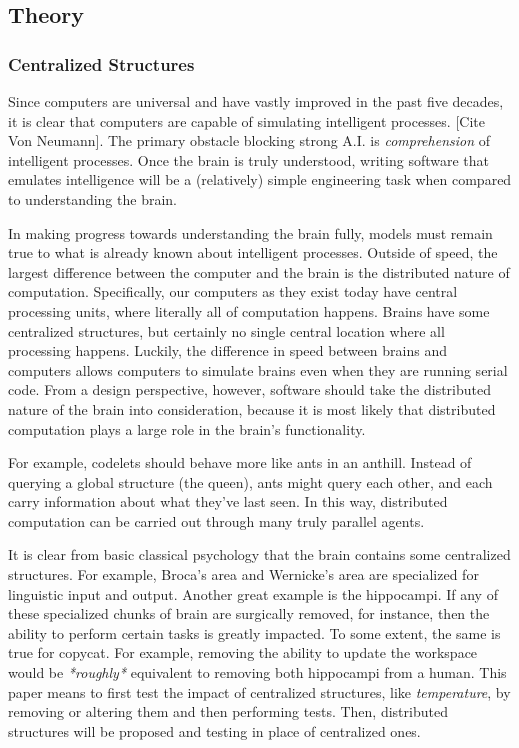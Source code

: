 \documentclass[a4paper]{article}
\begin{document}
\subsection{Theory}

    \subsubsection{Centralized Structures}

    Since computers are universal and have vastly improved in the past five decades, it is clear that computers are capable of simulating intelligent processes. 
    [Cite Von Neumann]. 
    The primary obstacle blocking strong A.I. is \emph{comprehension} of intelligent processes. 
    Once the brain is truly understood, writing software that emulates intelligence will be a (relatively) simple engineering task when compared to understanding the brain. 

    In making progress towards understanding the brain fully, models must remain true to what is already known about intelligent processes.
    Outside of speed, the largest difference between the computer and the brain is the distributed nature of computation. 
    Specifically, our computers as they exist today have central processing units, where literally all of computation happens. 
    Brains have some centralized structures, but certainly no single central location where all processing happens. 
    Luckily, the difference in speed between brains and computers allows computers to simulate brains even when they are running serial code.
    From a design perspective, however, software should take the distributed nature of the brain into consideration, because it is most likely that distributed computation plays a large role in the brain's functionality.

    For example, codelets should behave more like ants in an anthill.
    Instead of querying a global structure (the queen), ants might query each other, and each carry information about what they've last seen.
    In this way, distributed computation can be carried out through many truly parallel agents.

    It is clear from basic classical psychology that the brain contains some centralized structures.
    For example, Broca's area and Wernicke's area are specialized for linguistic input and output.
    Another great example is the hippocampi.
    If any of these specialized chunks of brain are surgically removed, for instance, then the ability to perform certain tasks is greatly impacted.
    To some extent, the same is true for copycat.
    For example, removing the ability to update the workspace would be \emph{*roughly*} equivalent to removing both hippocampi from a human.
    This paper means to first test the impact of centralized structures, like \emph{temperature}, by removing or altering them and then performing tests.
    Then, distributed structures will be proposed and testing in place of centralized ones.
\end{document}
